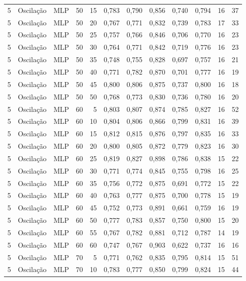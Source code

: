 \begin{longtable}{ccclrrrrrrrr}
5 & Oscilação & MLP & 50 & 15 & 0,783 & 0,790 & 0,856 & 0,740 & 0,794 & 16 & 37 \\
5 & Oscilação & MLP & 50 & 20 & 0,767 & 0,771 & 0,832 & 0,739 & 0,783 & 17 & 33 \\
5 & Oscilação & MLP & 50 & 25 & 0,757 & 0,766 & 0,846 & 0,706 & 0,770 & 16 & 23 \\
5 & Oscilação & MLP & 50 & 30 & 0,764 & 0,771 & 0,842 & 0,719 & 0,776 & 16 & 23 \\
5 & Oscilação & MLP & 50 & 35 & 0,748 & 0,755 & 0,828 & 0,697 & 0,757 & 16 & 21 \\
5 & Oscilação & MLP & 50 & 40 & 0,771 & 0,782 & 0,870 & 0,701 & 0,777 & 16 & 19 \\
5 & Oscilação & MLP & 50 & 45 & 0,800 & 0,806 & 0,875 & 0,737 & 0,800 & 16 & 18 \\
5 & Oscilação & MLP & 50 & 50 & 0,768 & 0,773 & 0,830 & 0,736 & 0,780 & 16 & 20 \\
5 & Oscilação & MLP & 60 & 5 & 0,803 & 0,807 & 0,874 & 0,785 & 0,827 & 16 & 52 \\
5 & Oscilação & MLP & 60 & 10 & 0,804 & 0,806 & 0,866 & 0,799 & 0,831 & 16 & 39 \\
5 & Oscilação & MLP & 60 & 15 & 0,812 & 0,815 & 0,876 & 0,797 & 0,835 & 16 & 33 \\
5 & Oscilação & MLP & 60 & 20 & 0,800 & 0,805 & 0,872 & 0,779 & 0,823 & 16 & 30 \\
5 & Oscilação & MLP & 60 & 25 & 0,819 & 0,827 & 0,898 & 0,786 & 0,838 & 15 & 22 \\
5 & Oscilação & MLP & 60 & 30 & 0,771 & 0,774 & 0,845 & 0,755 & 0,798 & 16 & 25 \\
5 & Oscilação & MLP & 60 & 35 & 0,756 & 0,772 & 0,875 & 0,691 & 0,772 & 15 & 22 \\
5 & Oscilação & MLP & 60 & 40 & 0,763 & 0,777 & 0,875 & 0,700 & 0,778 & 15 & 19 \\
5 & Oscilação & MLP & 60 & 45 & 0,752 & 0,773 & 0,891 & 0,661 & 0,759 & 16 & 19 \\
5 & Oscilação & MLP & 60 & 50 & 0,777 & 0,783 & 0,857 & 0,750 & 0,800 & 15 & 20 \\
5 & Oscilação & MLP & 60 & 55 & 0,767 & 0,782 & 0,881 & 0,712 & 0,787 & 14 & 19 \\
5 & Oscilação & MLP & 60 & 60 & 0,747 & 0,767 & 0,903 & 0,622 & 0,737 & 16 & 16 \\
5 & Oscilação & MLP & 70 & 5 & 0,771 & 0,762 & 0,835 & 0,795 & 0,814 & 15 & 51 \\
5 & Oscilação & MLP & 70 & 10 & 0,783 & 0,777 & 0,850 & 0,799 & 0,824 & 15 & 44 \\

\end{longtable}
